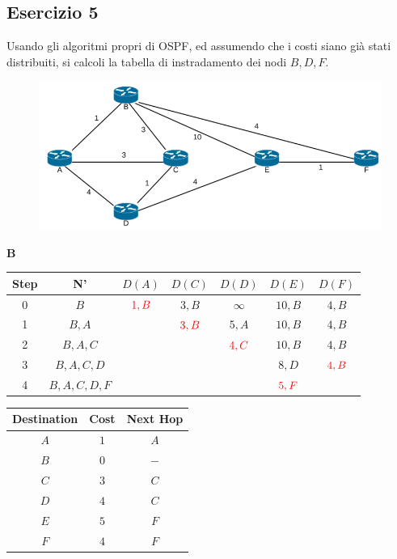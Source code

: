 \documentclass[10pt]{article}
\begin{document}
		\subsection{Esercizio 5}
			Usando gli algoritmi propri di OSPF, ed assumendo che i costi siano già stati distribuiti, si calcoli la tabella di instradamento dei nodi ${B,D,F}$.
			\begin{figure}[h]
				\centering
				\includegraphics[width=13cm]{es4}
			\end{figure}
			\begin{center}
				\textbf{B}
				\begin{tabular}{||c c c c c c c||} 
					\hline
					Step & N' & $D(A)$ & $D(C)$ & $D(D)$ & $D(E)$ & $D(F)$ \\[0.5ex] 
					\hline\hline
					0 & $B$ & $\color{red} 1,B$ & $3,B$ & $\infty$ & $10,B$ & $4,B$ \\
					\hline
					1 & $B,A$ &  & $\color{red} 3,B$ & $5,A$ & $10,B$ & $4,B$ \\
					\hline
					2 & $B,A,C$ & & & $\color{red} 4,C$ & $10,B$ & $4,B$ \\
					\hline
					3 & $B,A,C,D$ & & & & $8,D$ & $\color{red} 4,B$ \\
					\hline
					4 & $B,A,C,D,F$ & & & & $\color{red} 5,F$ & \\[0.5ex]  
					\hline
				\end{tabular}
				\quad
				\begin{tabular}{||c || c || c||}
					\hline
					Destination & Cost & Next Hop \\[0.5ex] 
					\hline\hline
					$A$ & $1$ & $A$ \\
					$B$ & $0$ & $-$ \\
					$C$ & $3$ & $C$ \\
					$D$ & $4$ & $C$ \\
					$E$ & $5$ & $F$ \\
					$F$ & $4$ & $F$ \\[0.5ex]
					\hline
				\end{tabular}
			\end{center}
			
\end{document}
